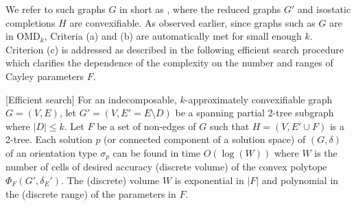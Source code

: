 We refer to such graphs $G$ in short as , where the reduced graphs $G'$ and isostatic completions $H$ are convexifiable. As observed earlier, since graphs such as $G$ are in OMD$_k$, Criteria (a) and (b) are automatically met for small enough $k$. Criterion (c) is addressed as described in the following efficient search procedure which clarifies the dependence of the complexity on the number and ranges  of Cayley parameters $F$.

\begin{theorem}\label{theorem:criterionc}
    [Efficient search]
    For an indecomposable, $k$-approximately convexifiable graph $G = (V,E)$, let $G' = (V,E' =E\setminus D)$ be a spanning partial 2-tree subgraph where $|D| \le  k$. Let  $F$ be a set of non-edges of $G$ such that $H = (V, E'\cup F)$ is a 2-tree. Each solution $p$ (or connected component of a solution space) of $(G,\delta)$ of an orientation type $\sigma_p$ can be found in time $O(\log(W))$ where $W$ is the number of cells of desired accuracy (discrete volume) of the convex polytope $\Phi_F(G',\delta_E')$. The (discrete) volume $W$ is exponential in $|F|$ and polynomial in the (discrete range) of the parameters in $F$.
\end{theorem}

